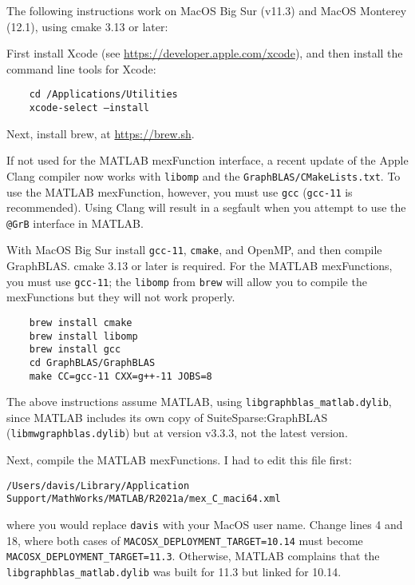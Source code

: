 \documentclass[12pt]{article}
\begin{document}
The following instructions work on MacOS Big Sur (v11.3)
and MacOS Monterey (12.1), using
cmake 3.13 or later:

First install Xcode (see \url{https://developer.apple.com/xcode}),
and then install the command line tools for Xcode:

    {\small
    \begin{verbatim}
    cd /Applications/Utilities
    xcode-select —install \end{verbatim} }

Next, install brew, at \url{https://brew.sh}.

If not used for the MATLAB mexFunction interface, a recent update of the Apple
Clang compiler now works with \verb'libomp' and the
\verb'GraphBLAS/CMakeLists.txt'.  To use the MATLAB mexFunction, however, you
must use \verb'gcc' (\verb'gcc-11' is recommended).  Using Clang will result in
a segfault when you attempt to use the \verb'@GrB' interface in MATLAB.

With MacOS Big Sur install \verb'gcc-11', \verb'cmake', and OpenMP, and then
compile GraphBLAS.  cmake 3.13 or later is required.  For the MATLAB
mexFunctions, you must use \verb'gcc-11'; the \verb'libomp' from \verb'brew'
will allow you to compile the mexFunctions but they will not work properly.

    {\small
    \begin{verbatim}
    brew install cmake
    brew install libomp
    brew install gcc
    cd GraphBLAS/GraphBLAS
    make CC=gcc-11 CXX=g++-11 JOBS=8 \end{verbatim} }

The above instructions assume MATLAB, using
\verb'libgraphblas_matlab.dylib', since MATLAB includes its
own copy of SuiteSparse:GraphBLAS (\verb'libmwgraphblas.dylib') but at version
v3.3.3, not the latest version.

Next, compile the MATLAB mexFunctions.  I had to edit this file first:

{\small
\begin{verbatim}
/Users/davis/Library/Application Support/MathWorks/MATLAB/R2021a/mex_C_maci64.xml \end{verbatim} }

where you would replace \verb'davis' with your MacOS user name.
Change lines 4 and 18, where both cases of \verb'MACOSX_DEPLOYMENT_TARGET=10.14'
must become \verb"MACOSX_DEPLOYMENT_TARGET=11.3".  Otherwise, MATLAB
complains that the \verb'libgraphblas_matlab.dylib' was built for 11.3 but
linked for 10.14.
\end{document}
